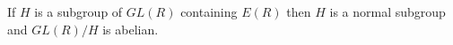 If $H$ is a subgroup of $GL(R)$ containing $E(R)$ then $H$ is a normal subgroup and $GL(R)/H$ is abelian.
